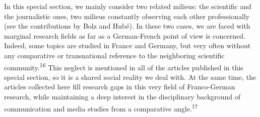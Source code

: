 \documentclass{tufte-handout}
\begin{document}
In this special section, we mainly consider two related milieus: the
scientific and the journalistic ones, two milieus constantly observing
each other professionally (see the contributions by Bolz and Hubé). In
these two cases, we are faced with marginal research fields as far as a
German-French point of view is concerned. Indeed, some topics are
studied in France and Germany, but very often without any comparative or
transnational reference to the neighboring scientific
community.\textsuperscript{16} This neglect is mentioned in all of the
articles published in this special section, so it is a shared social
reality we deal with. At the same time, the articles collected here fill
research gaps in this very field of Franco-German research, while
maintaining a deep interest in the disciplinary background of
communication and media studies from a comparative angle.\textsuperscript{17}
\end{document}
